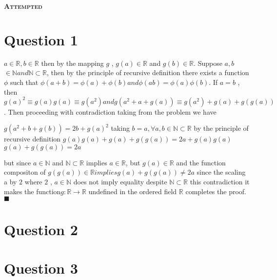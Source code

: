 \documentclass[a4paper, 12pt]{article}
\begin{document}
\begin{center}
    \fontsize{24pt}{10pt}\selectfont
    \textsc{\textbf{Attempted}}
\end{center}

\section{Question 1}

$a  \in  \mathbb{R}, b  \in  \mathbb{R}$ then by  the mapping $g$ , $g(a)  \in \mathbb{R}$ and
$g(b) \in \mathbb{R}$. Suppose $a,b$ $\in \mathbb{N} and \mathbb{N} \subset \mathbb{R}$, 
then by the principle of recursive definition there exists a function $\phi$ such that
$\phi(a + b) = \phi(a) + \phi(b) and \phi(ab) = \phi(a)\phi(b)$.
If $a = b$ , then $g(a)^2 \equiv g(a)g(a) \equiv g(a^2)  and g(a^2 + a + g(a)) \equiv g(a^2)  + g(a) + g(g(a))$.
Then proceeding with contradiction taking from the problem we have

\begin{center}
    
    $g(a^2 + b + g(b)) = 2b + g(a)^2$ 
    taking $b = a, \forall a,b \in \mathbb{N} \subset\mathbb{R}$ \newline
    by the principle of recursive definition \newline
    $g(a)g(a) + g(a) + g(g(a)) = 2a + g(a)g(a)$ \newline
    $g(a) + g(g(a)) = 2a$ \newline
    
\end{center}
but since $a \in \mathbb{N}$ and $\mathbb{N} \subset \mathbb{R}$ implies  $a \in \mathbb{R}$,
but $g(a) \in \mathbb{R}$ and the function compositon of $g(g(a)) \in \mathbb{R} implies g(a) + g(g(a))\neq 2a$ \newline
since the scaling a by $2$ where $2$ , $a \in\mathbb{N}$ does not imply equality despite $\mathbb{N} \subset \mathbb{R}$ \newline
this contradiction it makes the function$ g:\mathbb{R}\longrightarrow \mathbb{R}$ \newline
undefined in the ordered field $\mathbb{R}$
completes the proof. $\blacksquare$

\newpage

\section{Question 2}

\newpage

\section{Question 3}
\end{document}

